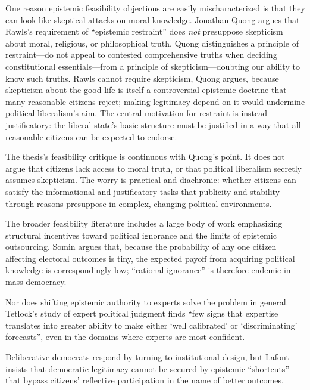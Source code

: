 \documentclass[12pt]{report}
\begin{document}
One reason epistemic feasibility objections are easily mischaracterized is that they can look like skeptical attacks on moral knowledge. Jonathan Quong argues that Rawls's requirement of ``epistemic restraint'' does \emph{not} presuppose skepticism about moral, religious, or philosophical truth.\parencite[p.~321]{quong2007without} Quong distinguishes a principle of restraint---do not appeal to contested comprehensive truths when deciding constitutional essentials\parencite[p.~321]{quong2007without}---from a principle of skepticism---doubting our ability to know such truths. Rawls cannot require skepticism, Quong argues, because skepticism about the good life is itself a controversial epistemic doctrine that many reasonable citizens reject; making legitimacy depend on it would undermine political liberalism's aim.\parencite[p.~322]{quong2007without} The central motivation for restraint is instead justificatory: the liberal state's basic structure must be justified in a way that all reasonable citizens can be expected to endorse.\parencite[p.~321]{quong2007without}

The thesis's feasibility critique is continuous with Quong's point. It does not argue that citizens lack access to moral truth, or that political liberalism secretly assumes skepticism. The worry is practical and diachronic: whether citizens can satisfy the informational and justificatory tasks that publicity and stability-through-reasons presuppose in complex, changing political environments.

The broader feasibility literature includes a large body of work emphasizing structural incentives toward political ignorance and the limits of epistemic outsourcing. Somin argues that, because the probability of any one citizen affecting electoral outcomes is tiny, the expected payoff from acquiring political knowledge is correspondingly low; \enquote{rational ignorance} is therefore endemic in mass democracy.\parencite[p.~77]{somin2013democracy}

Nor does shifting epistemic authority to experts solve the problem in general. Tetlock's study of expert political judgment finds \enquote{few signs that expertise translates into greater ability to make either `well calibrated' or `discriminating' forecasts}, even in the domains where experts are most confident.\parencite[p.~20]{tetlock2005expert}

Deliberative democrats respond by turning to institutional design, but Lafont insists that democratic legitimacy cannot be secured by epistemic \enquote{shortcuts} that bypass citizens' reflective participation in the name of better outcomes.\parencite[p.~3]{lafont2020democracy}
\end{document}
